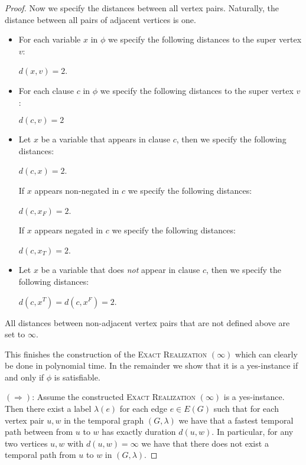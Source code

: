 \documentclass[11pt,a4paper]{article}
\theoremstyle{remark}
\theoremstyle{definition}
\begin{document}
\begin{proof}
Now we specify the distances between all vertex pairs. Naturally, the distance between all pairs of adjacent vertices is one.
\begin{itemize}
    

    \item For each variable $x$ in $\phi$ we specify the following distances to the super vertex $v$:

    $d(x,v)=2$. %

    \item For each clause $c$ in $\phi$ we specify the following distances to the super vertex $v$:

    $d(c,v)=2$
    \item Let $x$ be a variable that appears in clause $c$, then  we specify the following distances:

    $d(c,x)=2$.
    
    If $x$ appears non-negated in $c$ we specify the following distances:

    $d(c,x_F)=2$.

    If $x$ appears negated in $c$ we specify the following distances:

    $d(c,x_T)=2$.
    \item Let $x$ be a variable that does \emph{not} appear in clause $c$, then we specify the following distances:

    $d(c,x^T)=d(c,x^F)=2$.
\end{itemize}
All distances between non-adjacent vertex pairs that are not defined above are set to $\infty$.

This finishes the construction of the \textsc{Exact Realization $(\infty)$} which can clearly be done in polynomial time. In the remainder we show that it is a yes-instance if and only if $\phi$ is satisfiable.

$(\Rightarrow)$: Assume the constructed \textsc{Exact Realization $(\infty)$} is a yes-instance. Then there exist a label $\lambda(e)$ for each edge $e\in E(G)$ such that for each vertex pair $u,w$ in the temporal graph $(G,\lambda)$ we have that a fastest temporal path between from $u$ to $w$ has exactly duration $d(u,w)$. In particular, for any two vertices $u,w$ with $d(u,w)=\infty$ we have that there does not exist a temporal path from $u$ to $w$ in $(G,\lambda)$.


\end{proof}
\end{document}
